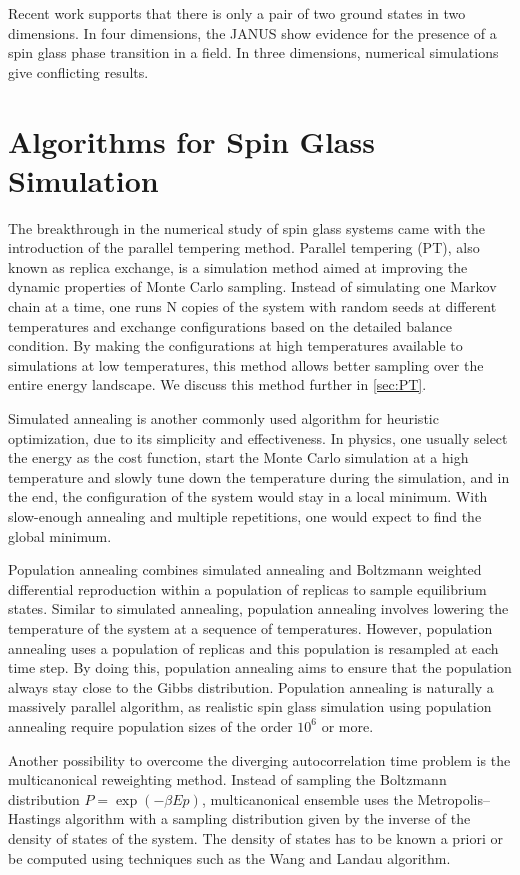 Recent work supports that there is only a pair of two ground states in two dimensions.
In four dimensions, the JANUS show evidence for the presence of a spin glass
phase transition in a field. In three dimensions, numerical simulations give 
conflicting results.


\section{Algorithms for Spin Glass Simulation}
The breakthrough in the numerical study of spin glass systems came with the 
introduction of the parallel tempering method\cite{Swendsen-Wang-1986,Hukushima-Nemoto1996,Marinari-Parisi1992}. 
Parallel tempering (PT), also known
as replica exchange, is a simulation method aimed at improving the dynamic 
properties of Monte Carlo sampling. Instead of simulating one Markov chain at 
a time, one runs N copies of the system with random seeds at different 
temperatures and exchange configurations based on the detailed balance condition.
By making the configurations at high temperatures available to simulations at 
low temperatures, this method allows better sampling over the entire energy
landscape. We discuss this method further in \ref{sec:PT}.

Simulated annealing\citep{1983Sci...220..671K} is another commonly used algorithm for heuristic optimization,
due to its simplicity and effectiveness. In physics, one usually select the 
energy as the cost function, start the Monte Carlo simulation at a high temperature
and slowly tune down the temperature during the simulation, and in the end, the
configuration of the system would stay in a local minimum. With slow-enough annealing
and multiple repetitions, one would expect to find the global minimum.  

Population annealing\citep{2015PhRvE..92f3307W} combines simulated annealing and Boltzmann weighted 
differential reproduction within a population of replicas to sample equilibrium 
states. Similar to simulated annealing, population annealing involves lowering 
the temperature of the system at a sequence of temperatures. However, population annealing uses a 
population of replicas and this population is resampled at each time step.
By doing this, population annealing aims to ensure that the population always stay close to the 
Gibbs distribution. Population annealing is naturally a massively
parallel algorithm, as realistic spin glass simulation using population 
annealing require population sizes of the order $10^6$ or more.

Another possibility to overcome the diverging autocorrelation time problem is the 
multicanonical reweighting method\citep{1998PhyA..254..164J}. Instead of sampling the Boltzmann 
distribution $P=\exp(-\beta Ep)$, multicanonical ensemble uses the 
Metropolis–Hastings algorithm with a sampling distribution given by the inverse 
of the density of states of the system. The density of states has to be known 
a priori or be computed using techniques such as the Wang and Landau algorithm.



